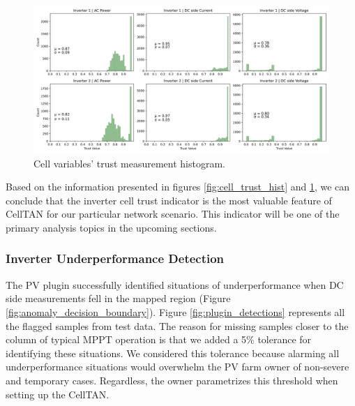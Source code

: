 \begin{figure}[h!]
    \centering
    \includegraphics[width=\textwidth]{figures/chapter5/results/real/51_hist_trust_vars-1.png}
    \caption{Cell variables' trust measurement histogram.}
    \label{fig:var_trust_hist}
\end{figure}

Based on the information presented in figures \ref{fig:cell_trust_hist} and \ref{fig:var_trust_hist}, we can conclude that the inverter cell trust indicator is the most valuable feature of CellTAN for our particular network scenario. This indicator will be one of the primary analysis topics in the upcoming sections.

\subsubsection{Inverter Underperformance Detection}

The PV plugin successfully identified situations of underperformance when DC side measurements fell in the mapped region (Figure \ref{fig:anomaly_decision_boundary}). Figure \ref{fig:plugin_detections} represents all the flagged samples from test data. The reason for missing samples closer to the column of typical MPPT operation is that we added a 5\% tolerance for identifying these situations. We considered this tolerance because alarming all underperformance situations would overwhelm the PV farm owner of non-severe and temporary cases. Regardless, the owner parametrizes this threshold when setting up the CellTAN.

